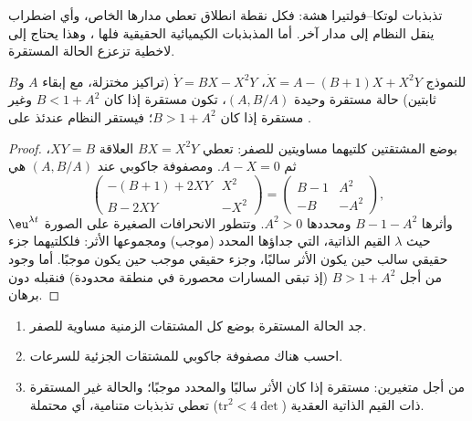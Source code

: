 تذبذبات لوتكا--فولتيرا هشة: فكل نقطة انطلاق تعطي مدارها
الخاص، وأي اضطراب ينقل النظام إلى مدار آخر. أما المذبذبات
الكيميائية الحقيقية فلها ، وهذا يحتاج إلى لاخطية تزعزع
الحالة المستقرة.

\begin{proposition}\label{prop:b3:complex-kinetics:hopf}
للنموذج $\dot X = A - (B + 1)X + X^2Y$، $\dot Y = BX - X^2Y$ (تراكيز مختزلة،
مع إبقاء $A$ و$B$ ثابتين) حالة مستقرة وحيدة $(A, B/A)$، تكون
مستقرة إذا كان $B < 1 + A^2$ وغير مستقرة إذا كان $B > 1 + A^2$؛ فيستقر النظام عندئذ على
.
\end{proposition}

\begin{proof}
بوضع المشتقتين كلتيهما مساويتين للصفر: تعطي $BX = X^2Y$ العلاقة $XY = B$، ثم $A - X = 0$. 
ومصفوفة جاكوبي عند $(A, B/A)$ هي
\[
  \begin{pmatrix} -(B + 1) + 2XY & X^2 \\ B - 2XY & -X^2 \end{pmatrix}
  = \begin{pmatrix} B - 1 & A^2 \\ -B & -A^2 \end{pmatrix},
\]
وأثرها $B - 1 - A^2$ ومحددها $A^2 > 0$. وتتطور الانحرافات الصغيرة على الصورة
$\eu^{\lambda t}$ حيث $\lambda$ القيم الذاتية، التي جداؤها المحدد (موجب)
ومجموعها الأثر: فلكلتيهما جزء حقيقي سالب حين يكون الأثر
سالبًا، وجزء حقيقي موجب حين يكون موجبًا. أما وجود  من أجل $B > 1 + A^2$ (إذ تبقى المسارات محصورة في منطقة محدودة) فنقبله
دون برهان.
\end{proof}

\begin{method}\label{met:b3:complex-kinetics:stability}
\begin{enumerate}
  \item جد الحالة المستقرة بوضع كل المشتقات الزمنية مساوية للصفر.
  \item احسب هناك مصفوفة جاكوبي للمشتقات الجزئية للسرعات.
  \item من أجل متغيرين: مستقرة إذا كان الأثر سالبًا والمحدد
        موجبًا؛ والحالة غير المستقرة ذات القيم الذاتية العقدية
        ($\mathrm{tr}^2 < 4\det$) تعطي تذبذبات متنامية، أي  محتملة.
\end{enumerate}
\end{method}

